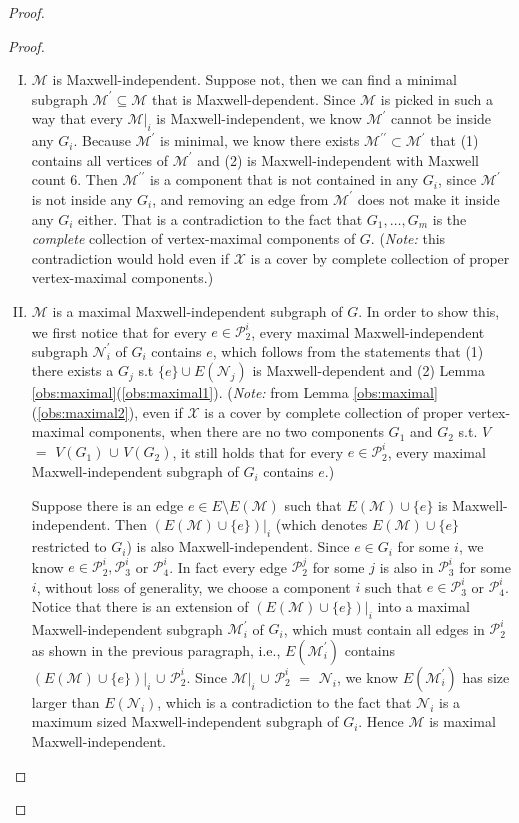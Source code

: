 \documentclass[10pt]{article}
\def\M{\mathcal {M}}
\def\N{\mathcal {N}}
\def\X{\mathcal {X}}
\def\P{\mathscr{P}}
\begin{document}
\begin{proof}
\begin{proof}
\begin{enumerate}[(I)]
\item $\M$ is Maxwell-independent. Suppose not, then we can find a minimal subgraph $\M^\prime \subseteq \M$ that is Maxwell-dependent. Since $\M$ is picked in such a way that every $\M|_i$ is Maxwell-independent, we know $\M^\prime$ cannot be inside any $G_i$. Because $\M^\prime$ is minimal, we know there exists $\M^{\prime\prime} \subset \M^\prime$ that (1) contains all vertices of $\M^\prime$ and (2) is Maxwell-independent with Maxwell count $6$.
Then $\M^{\prime\prime}$ is a component that is not contained in any $G_i$, since $\M^\prime$ is not inside any $G_i$, and removing an edge from $\M^\prime$ does not make it inside any $G_i$ either. That is a contradiction to the fact that $G_1, \ldots, G_m$ is the {\em complete} collection of vertex-maximal components of $G$. ({\em Note:} this contradiction would hold even if $\X$ is a cover by complete collection of proper vertex-maximal components.)

\item $\M$ is a maximal Maxwell-independent subgraph of $G$. In order to show this, we first notice that for every $e\in \P_2^i$, every maximal Maxwell-independent subgraph $\N_i^\prime$ of $G_i$ contains $e$, which follows from the statements that (1) there exists a $G_j$ s.t $ \{e\} \cup E(\N_j)$ is Maxwell-dependent and (2) Lemma \ref{obs:maximal}(\ref{obs:maximal1}). ({\em Note:} from Lemma \ref{obs:maximal}(\ref{obs:maximal2}), even if $\X$ is a cover by complete collection of proper vertex-maximal components, when there are no two components $G_1$ and $G_2$ s.t. $V$ $=$ $V(G_1)$ $\cup$ $V(G_2)$, it still holds that for every $e\in \P_2^i$, every maximal Maxwell-independent subgraph of $G_i$ contains $e$.)





Suppose there is an edge $e \in E\setminus E(\M)$ such that $E(\M)\cup \{e\}$ is  Maxwell-independent. Then $(E(\M)\cup \{e\})|_i$ (which denotes $E(\M)\cup \{e\}$ restricted to $G_i$) is also Maxwell-independent. Since $e\in G_i$ for some $i$, we know $e\in \P_2^i, \P_3^i$ or $\P_4^i$. In fact every edge $\P_2^j$ for some $j$ is also in $\P_3^i$ for some $i$, without loss of generality, we choose a component $i$ such that $e\in \P_3^i$ or $\P_4^i$. 
Notice that there is an extension of $(E(\M)\cup \{e\})|_i$ into a maximal Maxwell-independent subgraph $\M_i^\prime$ of $G_i$, which must contain all edges in $\P_2^i$ as shown in the previous paragraph, i.e., $E(\M_i^\prime)$ contains $(E(\M)\cup \{e\})|_i$ $\cup$ $\P_2^i$. Since $\M|_i$ $\cup$ $\P_2^i$ $=$ $\N_i$, we know $E(\M_i^\prime)$ has size larger than $E(\N_i)$, which is a contradiction to the fact that $\N_i$ is a maximum sized Maxwell-independent subgraph of $G_i$. Hence $\M$ is maximal Maxwell-independent.


\end{enumerate}
\end{proof}
\end{proof}
\end{document}
